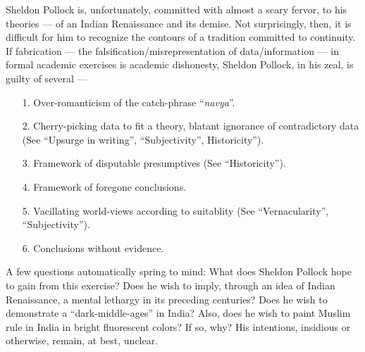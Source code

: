 Sheldon Pollock is, unfortunately, committed with almost a scary fervor, to his theories — of an Indian Renaissance and its demise. Not surprisingly, then, it is difficult for him to recognize the contours of a tradition committed to continuity. If fabrication — the falsification/misrepresentation of data/information —  in formal academic exercises is academic dishonesty, Sheldon Pollock, in his zeal, is guilty of several — 
\begin{itemize}
\itemsep=1pt
\item[1.] Over-romanticism of the catch-phrase “{\sl navya}”.
\item[2.] Cherry-picking data to fit a theory, blatant ignorance of contradictory data (See “Upsurge in writing”, “Subjectivity”, Historicity”).
\item[3.] Framework of disputable presumptives (See “Historicity”).
\item[4.] Framework of foregone conclusions. 
\item[5.] Vacillating world-views according to suitablity (See “Vernacularity”, “Subjectivity”).
\item[6.] Conclusions without evidence.
\end{itemize}

A few questions automatically spring to mind: What does Sheldon Pollock hope to gain from this exercise? Does he wish to imply, through an idea of Indian Renaissance, a mental lethargy in its preceding centuries? Does he wish to demonstrate a “dark-middle-ages” in India? Also, does he wish to paint Muslim rule in India in bright fluorescent colors? If so, why? His intentions, insidious or otherwise, remain, at best, unclear. 

